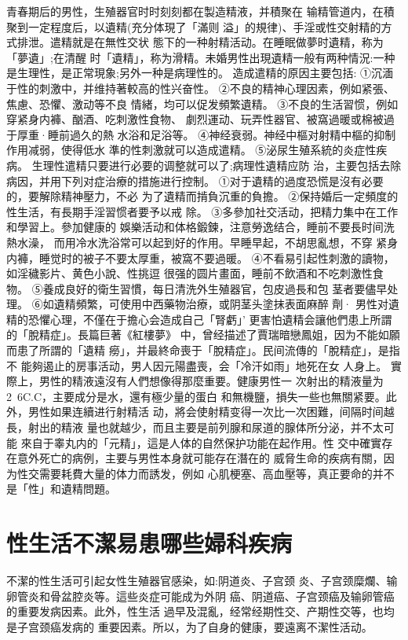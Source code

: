 \documentclass[12pt,UTF8]{ctexbook}
\begin{document}
青春期后的男性，生殖器官时时刻刻都在製造精液，并積聚在
输精管道内，在積聚到一定程度后，以遺精(充分体現了「滿则
溢」的規律)、手淫或性交射精的方式排泄。遣精就是在無性交状
態下的一种射精活动。在睡眠做夢时遺精，称为「夢遺」;在清醒
时「遺精」，称为滑精。未婚男性出現遺精一般有两种情況:一种
是生理性，是正常現象;另外一种是病理性的。
造成遣精的原因主要包括:
①沉湎于性的刺激中，并维持著較高的性兴奋性。
②不良的精神心理因素，例如紧張、焦慮、恐懼、激动等不良
情緒，均可以促发頻繁遺精。
③不良的生活習惯，例如穿紧身内褲、酗酒、吃刺激性食物、
劇烈運动、玩弄性器官、被窩過暖或棉被過于厚重·睡前過久的熱
水浴和足浴等。
④神经衰弱。神经中樞对射精中樞的抑制作用减弱，使得低水
準的性刺激就可以造成遣精。
⑤泌尿生殖系統的炎症性疾病。
生理性遣精只要进行必要的调整就可以了;病理性遺精应防
治，主要包括去除病因，并用下列对症治療的措施进行控制。
①对于遺精的過度恐慌是沒有必要的，要解除精神壓力，不必
为了遺精而掯負沉重的負擔。
②保持婚后一定頻度的性生活，有長期手淫習惯者要予以戒
除。
③多參加社交活动，把精力集中在工作和學習上。參加健康的
娛樂活动和体格鍛鍊，注意勞逸结合，睡前不要長时间洗熱水澡，
而用冷水洗浴常可以起到好的作用。早睡早起，不胡思亂想，不穿
紧身内褲，睡觉时的被子不要太厚重，被窩不要過暖。
④不看易引起性刺激的讀物，如淫穢影片、黄色小說、性挑逗
很强的圆片畫面，睡前不飲酒和不吃刺激性食物。
⑤養成良好的衛生習慣，每日清洗外生殖器官，包皮過長和包
茎者要儘早处理。
⑥如遺精頻繁，可使用中西藥物治療，或阴茎头塗抹表面麻醉
劑·
男性对遺精的恐懼心理，不僅在于擔心会造成自己「腎虧」’
更害怕遺精会讓他們患上所謂的「脫精症」。長篇巨著《紅樓夢》
中，曾经描述了賈瑞暗戀鳳姐，因为不能如願而患了所謂的「遺精
癆」，并最終命喪于「脫精症」。民间流傳的「脫精症」，是指不
能夠遏止的房事活动，男人因元陽盡喪，会「冷汗如雨」地死在女
人身上。
實際上，男性的精液遠沒有人們想像得那麼重要。健康男性一
次射出的精液量为2~6C.C，主要成分是水，還有極少量的蛋白
和無機鹽，損失一些也無關紧要。此外，男性如果连續进行射精活
动，將会使射精变得一次比一次困難，间隔时间越長，射出的精液
量也就越少，而且主要是前列腺和尿道的腺体所分泌，并不太可能
來自于睾丸内的「元精」，這是人体的自然保护功能在起作用。性
交中確實存在意外死亡的病例，主要与男性本身就可能存在潛在的
威脅生命的疾病有關，因为性交需要耗費大量的体力而誘发，例如
心肌梗塞、高血壓等，真正要命的并不是「性」和遺精問題。

\section{性生活不潔易患哪些婦科疾病}

不潔的性生活可引起女性生殖器官感染，如:阴道炎、子宫颈
炎、子宫颈糜爛、输卵管炎和骨盆腔炎等。這些炎症可能成为外阴
癌、阴道癌、子宫颈癌及输卵管癌的重要发病因素。此外，性生活
過早及混亂，经常经期性交、产期性交等，也均是子宫颈癌发病的
重要因素。所以，为了自身的健康，要遠离不潔性活动。
\end{document}
